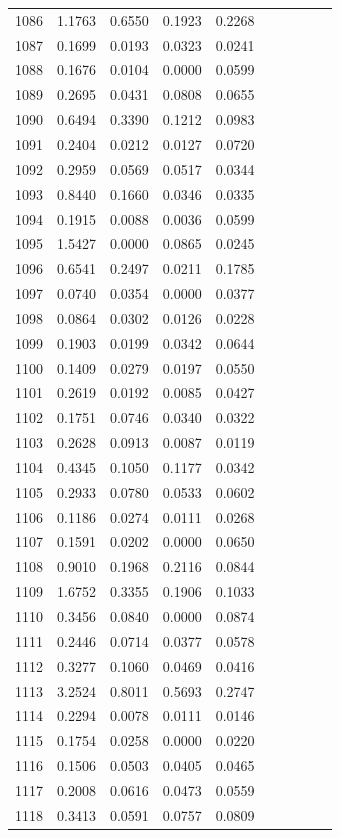 \begin{table}
\begin{tabular}{cccccccccc}
1086& 1.1763& 0.6550& 0.1923& 0.2268\\ 
1087& 0.1699& 0.0193& 0.0323& 0.0241\\ 
1088& 0.1676& 0.0104& 0.0000& 0.0599\\ 
1089& 0.2695& 0.0431& 0.0808& 0.0655\\ 
1090& 0.6494& 0.3390& 0.1212& 0.0983\\ 
1091& 0.2404& 0.0212& 0.0127& 0.0720\\ 
1092& 0.2959& 0.0569& 0.0517& 0.0344\\ 
1093& 0.8440& 0.1660& 0.0346& 0.0335\\ 
1094& 0.1915& 0.0088& 0.0036& 0.0599\\ 
1095& 1.5427& 0.0000& 0.0865& 0.0245\\ 
1096& 0.6541& 0.2497& 0.0211& 0.1785\\ 
1097& 0.0740& 0.0354& 0.0000& 0.0377\\ 
1098& 0.0864& 0.0302& 0.0126& 0.0228\\ 
1099& 0.1903& 0.0199& 0.0342& 0.0644\\ 
1100& 0.1409& 0.0279& 0.0197& 0.0550\\ 
1101& 0.2619& 0.0192& 0.0085& 0.0427\\ 
1102& 0.1751& 0.0746& 0.0340& 0.0322\\ 
1103& 0.2628& 0.0913& 0.0087& 0.0119\\ 
1104& 0.4345& 0.1050& 0.1177& 0.0342\\ 
1105& 0.2933& 0.0780& 0.0533& 0.0602\\ 
1106& 0.1186& 0.0274& 0.0111& 0.0268\\ 
1107& 0.1591& 0.0202& 0.0000& 0.0650\\ 
1108& 0.9010& 0.1968& 0.2116& 0.0844\\ 
1109& 1.6752& 0.3355& 0.1906& 0.1033\\ 
1110& 0.3456& 0.0840& 0.0000& 0.0874\\ 
1111& 0.2446& 0.0714& 0.0377& 0.0578\\ 
1112& 0.3277& 0.1060& 0.0469& 0.0416\\ 
1113& 3.2524& 0.8011& 0.5693& 0.2747\\ 
1114& 0.2294& 0.0078& 0.0111& 0.0146\\ 
1115& 0.1754& 0.0258& 0.0000& 0.0220\\ 
1116& 0.1506& 0.0503& 0.0405& 0.0465\\ 
1117& 0.2008& 0.0616& 0.0473& 0.0559\\ 
1118& 0.3413& 0.0591& 0.0757& 0.0809\\ 

\end{tabular}
\end{table}
